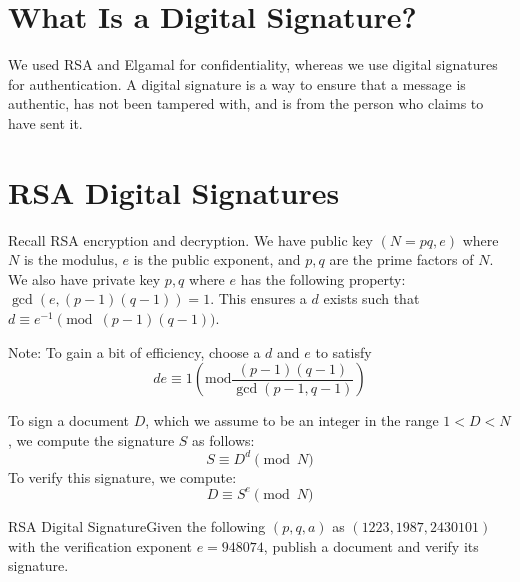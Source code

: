 \section{What Is a Digital Signature?}

We used RSA and Elgamal for confidentiality, whereas we use digital signatures for authentication. A digital signature is a way to ensure that a message is authentic, has not been tampered with, and is from the person who claims to have sent it.

\section{RSA Digital Signatures}

Recall RSA encryption and decryption. We have public key \((N = pq, e)\) where \(N\) is the modulus, \(e\) is the public exponent, and \(p, q\) are the prime factors of \(N\). We also have private key \(p,q\) where \(e\) has the following property: \(\gcd(e, (p-1)(q-1)) = 1\). This ensures a \(d\) exists such that \(d \equiv e^{-1} \pmod{(p-1)(q-1)}\).

\begin{note}
    Note: To gain a bit of efficiency, choose a \(d\) and \(e\) to satisfy \[
        de \equiv 1 \left(\text{mod}\frac{(p-1)(q-1)}{\gcd(p-1,q-1)}\right)
    \]
\end{note}

To sign a document \(D\), which we assume to be an integer in the range \(1 < D < N\), we compute the signature \(S\) as follows:
\[
    S \equiv D^{d} \pmod{N}
\]
To verify this signature, we compute:
\[
    D \equiv S^{e} \pmod{N}
\]

\begin{example}
    {RSA Digital Signature}Given the following \((p,q,a)\) as \((1223,1987,2430101)\) with the verification exponent \(e = 948074\), publish a document and verify its signature.
\end{example}


